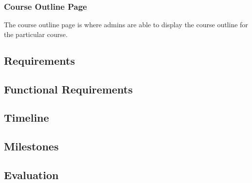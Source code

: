 \subsubsection{Course Outline Page}
The course outline page is where admins are able to display the course outline for the particular course. 

\subsection{Requirements}

\subsection{Functional Requirements}

\subsection{Timeline}

\subsection{Milestones}

\subsection{Evaluation}